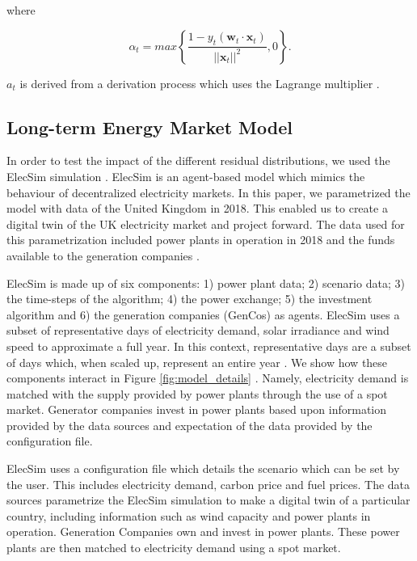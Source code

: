\documentclass[final,3p,times,twocolumn,numbers]{elsarticle}
\begin{document}
\noindent where 

\begin{equation}
\alpha_t=max\left\{\frac{1-y_t(\boldsymbol{w}_t\cdot\boldsymbol{x}_t)}{\left|\left|\boldsymbol{x}_t\right|\right|^2},0\right\}. 	
\end{equation}

\noindent $a_t$ is derived from a derivation process which uses the Lagrange multiplier \cite{Gzik2014}.

\subsection{Long-term Energy Market Model}


In order to test the impact of the different residual distributions, we used the ElecSim simulation \cite{Kell,Kell2020}. ElecSim is an agent-based model which mimics the behaviour of decentralized electricity markets. In this paper, we parametrized the model with data of the United Kingdom in 2018. This enabled us to create a digital twin of the UK electricity market and project forward. The data used for this parametrization included power plants in operation in 2018 and the funds available to the generation companies \cite{dukes_511, companies_house}.

ElecSim is made up of six components: 1) power plant data; 2) scenario data; 3) the time-steps of the algorithm; 4) the power exchange; 5) the investment algorithm and 6) the generation companies (GenCos) as agents. ElecSim uses a subset of representative days of electricity demand, solar irradiance and wind speed to approximate a full year. In this context, representative days are a subset of days which, when scaled up, represent an entire year \cite{Kell2020}. We show how these components interact in Figure \ref{fig:model_details} \cite{Kell}. Namely, electricity demand is matched with the supply provided by power plants through the use of a spot market. Generator companies invest in power plants based upon information provided by the data sources and expectation of the data provided by the configuration file. 



ElecSim uses a configuration file which details the scenario which can be set by the user. This includes electricity demand, carbon price and fuel prices. The data sources parametrize the ElecSim simulation to make a digital twin of a particular country, including information such as wind capacity and power plants in operation. Generation Companies own and invest in power plants. These power plants are then matched to electricity demand using a spot market.
\end{document}
